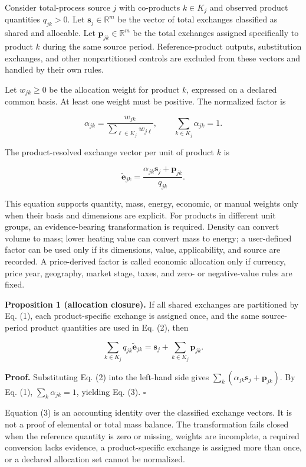 \documentclass[
  10pt,
  a4paper,
  DIV=11,
  numbers=noendperiod]{scrartcl}
\begin{document}
Consider total-process source \(j\) with co-products \(k\in K_j\) and
observed product quantities \(q_{jk}>0\). Let
\(\mathbf{s}_j\in\mathbb{R}^{m}\) be the vector of total exchanges
classified as shared and allocable. Let
\(\mathbf{p}_{jk}\in\mathbb{R}^{m}\) be the total exchanges assigned
specifically to product \(k\) during the same source period.
Reference-product outputs, substitution exchanges, and other
nonpartitioned controls are excluded from these vectors and handled by
their own rules.

Let \(w_{jk}\geq 0\) be the allocation weight for product \(k\),
expressed on a declared common basis. At least one weight must be
positive. The normalized factor is

\[
\alpha_{jk}=\frac{w_{jk}}{\sum_{\ell\in K_j} w_{j\ell}},
\qquad
\sum_{k\in K_j}\alpha_{jk}=1.
\tag{1}
\]

The product-resolved exchange vector per unit of product \(k\) is

\[
\widetilde{\mathbf e}_{jk}
=
\frac{\alpha_{jk}\mathbf{s}_j+\mathbf{p}_{jk}}{q_{jk}}.
\tag{2}
\]

This equation supports quantity, mass, energy, economic, or manual
weights only when their basis and dimensions are explicit. For products
in different unit groups, an evidence-bearing transformation is
required. Density can convert volume to mass; lower heating value can
convert mass to energy; a user-defined factor can be used only if its
dimensions, value, applicability, and source are recorded. A
price-derived factor is called economic allocation only if currency,
price year, geography, market stage, taxes, and zero- or negative-value
rules are fixed.

\textbf{Proposition 1 (allocation closure).} If all shared exchanges are
partitioned by Eq. (1), each product-specific exchange is assigned once,
and the same source-period product quantities are used in Eq. (2), then

\[
\sum_{k\in K_j}q_{jk}\widetilde{\mathbf e}_{jk}
=
\mathbf{s}_j+\sum_{k\in K_j}\mathbf{p}_{jk}.
\tag{3}
\]

\textbf{Proof.} Substituting Eq. (2) into the left-hand side gives
\(\sum_k(\alpha_{jk}\mathbf{s}_j+\mathbf{p}_{jk})\). By Eq. (1),
\(\sum_k\alpha_{jk}=1\), yielding Eq. (3). \(\square\)

Equation (3) is an accounting identity over the classified exchange
vectors. It is not a proof of elemental or total mass balance. The
transformation fails closed when the reference quantity is zero or
missing, weights are incomplete, a required conversion lacks evidence, a
product-specific exchange is assigned more than once, or a declared
allocation set cannot be normalized.
\end{document}
